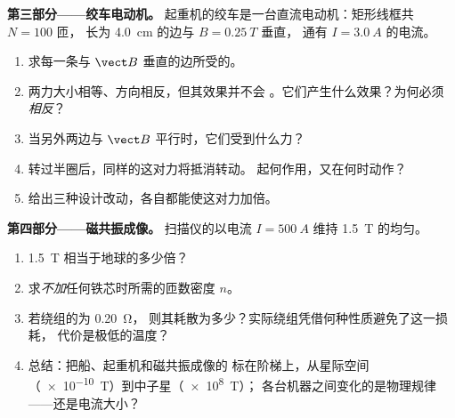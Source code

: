 \begin{problem}
\medskip
\noindent\textbf{第三部分——绞车电动机。}
起重机的绞车是一台直流电动机：矩形线框共 $N = 100$ 匝，
长为 \qty{4.0}{cm} 的边与 $B = \qty{0.25}{T}$ 垂直，
通有 $I = \qty{3.0}{A}$ 的电流。
\begin{enumerate}[resume]
  \item 求每一条与 $\vect B$ 垂直的边所受的。
  \item 两力大小相等、方向相反，但其效果并不会
        。它们产生什么效果？为何必须\emph{相反}？
  \item 当另外两边与 $\vect B$ 平行时，它们受到什么力？
  \item 转过半圈后，同样的这对力将抵消转动。
        起何作用，又在何时动作？
  \item 给出三种设计改动，各自都能使这对力加倍。
\end{enumerate}

\medskip
\noindent\textbf{第四部分——磁共振成像。}
扫描仪的以电流
$I = \qty{500}{A}$ 维持 \qty{1.5}{T} 的均匀。
\begin{enumerate}[resume]
  \item \qty{1.5}{T} 相当于地球的多少倍？
  \item 求\emph{不加}任何铁芯时所需的匝数密度 $n$。
  \item 若绕组的为 \qty{0.20}{\ohm}，
        则其耗散为多少？实际绕组凭借何种性质避免了这一损耗，
        代价是极低的温度？
  \item 总结：把船、起重机和磁共振成像的
        标在阶梯上，从星际空间
        （\qty{e-10}{T}）到中子星（\qty{e8}{T}）；
        各台机器之间变化的是物理规律——还是电流大小？
\end{enumerate}
\end{problem}
